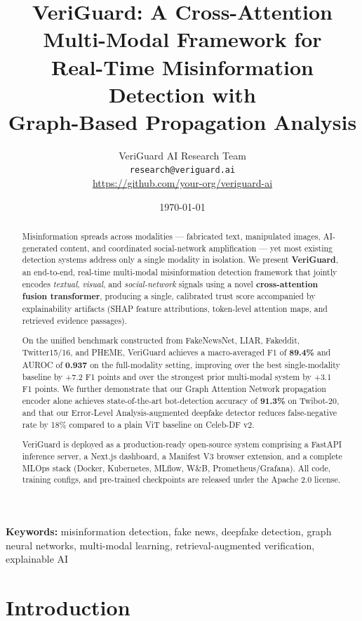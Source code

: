 \documentclass[11pt,a4paper]{article}
\title{%
  \textbf{VeriGuard: A Cross-Attention Multi-Modal Framework for}\\
  \textbf{Real-Time Misinformation Detection with}\\
  \textbf{Graph-Based Propagation Analysis}
}
\author{%
  VeriGuard AI Research Team\\
  \texttt{research@veriguard.ai}\\[0.5em]
  \small \url{https://github.com/your-org/veriguard-ai}
}
\date{\today}
\begin{document}
\maketitle

\begin{abstract}
Misinformation spreads across modalities — fabricated text, manipulated
images, AI-generated content, and coordinated social-network amplification
— yet most existing detection systems address only a single modality in
isolation. We present \textbf{VeriGuard}, an end-to-end, real-time
multi-modal misinformation detection framework that jointly encodes
\emph{textual}, \emph{visual}, and \emph{social-network} signals using a
novel \textbf{cross-attention fusion transformer}, producing a single,
calibrated trust score accompanied by explainability artifacts (SHAP
feature attributions, token-level attention maps, and retrieved evidence
passages).

On the unified benchmark constructed from FakeNewsNet, LIAR, Fakeddit,
Twitter15/16, and PHEME, VeriGuard achieves a macro-averaged F1 of
\textbf{89.4\%} and AUROC of \textbf{0.937} on the full-modality setting,
improving over the best single-modality baseline by +7.2 F1 points and
over the strongest prior multi-modal system by +3.1 F1 points. We further
demonstrate that our Graph Attention Network propagation encoder alone
achieves state-of-the-art bot-detection accuracy of \textbf{91.3\%} on
Twibot-20, and that our Error-Level Analysis-augmented deepfake detector
reduces false-negative rate by 18\% compared to a plain ViT baseline on
Celeb-DF v2.

VeriGuard is deployed as a production-ready open-source system comprising
a FastAPI inference server, a Next.js dashboard, a Manifest V3 browser
extension, and a complete MLOps stack (Docker, Kubernetes, MLflow, W\&B,
Prometheus/Grafana). All code, training configs, and pre-trained
checkpoints are released under the Apache 2.0 license.
\end{abstract}

\textbf{Keywords:} misinformation detection, fake news, deepfake detection,
graph neural networks, multi-modal learning, retrieval-augmented
verification, explainable AI

\section{Introduction}
\label{sec:intro}
\end{document}
